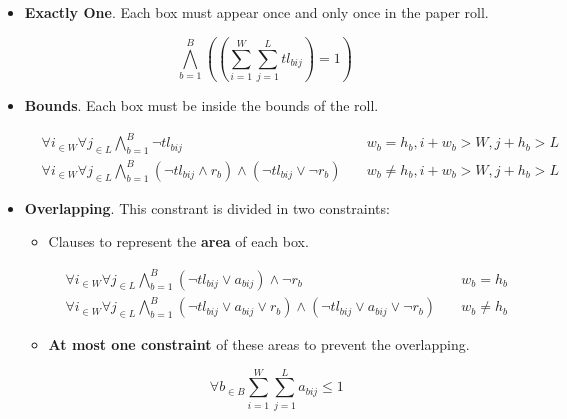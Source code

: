 \documentclass[12pt, a4paper]{article} %
\begin{document}
\begin{itemize}
  \item \textbf{Exactly One}. Each box must appear once and only once in the paper roll.

  \begin{equation}\label{eq:1}
    \bigwedge\limits_{b=1}^{B} ((\sum_{i=1}^{W} \sum_{j=1}^{L} tl_{bij}) = 1)
  \end{equation}

  \item \textbf{Bounds}. Each box must be inside the bounds of the roll.

  \begin{equation}\label{eq:2}
    \begin{aligned}
      &\forall i_{\in W} \forall j_{\in L} \bigwedge\limits_{b=1}^{B} \neg tl_{bij} & \quad w_b = h_b, i+w_b > W, j + h_b > L\\
      &\forall i_{\in W} \forall j_{\in L} \bigwedge\limits_{b=1}^{B} (\neg tl_{bij} \land r_b) \land (\neg tl_{bij} \lor \neg r_b) & \quad w_b \neq h_b, i+w_b > W, j + h_b > L
    \end{aligned}
  \end{equation}

  \item \textbf{Overlapping}. This constrant is divided in two constraints:

    \begin{itemize}
      \item Clauses to represent the \textbf{area} of each box.

        \begin{equation}\label{eq:3}
          \begin{aligned}
            &\forall i_{\in W} \forall j_{\in L} \bigwedge\limits_{b=1}^{B} (\neg tl_{bij} \lor a_{bij}) \land \neg r_b & \quad w_b = h_b \\
            &\forall i_{\in W} \forall j_{\in L} \bigwedge\limits_{b=1}^{B} (\neg tl_{bij} \lor a_{bij} \lor r_b) \land (\neg tl_{bij} \lor a_{bij} \lor \neg r_b) & \quad w_b \neq h_b
          \end{aligned}
        \end{equation}

      \item \textbf{At most one constraint} of these areas to prevent the \mbox{overlapping}.

        \begin{equation}\label{eq:4}
          \forall b_{\in B} \sum_{i=1}^{W} \sum_{j=1}^{L} a_{bij} \leq 1
        \end{equation}


\end{itemize}
\end{itemize}
\end{document}
